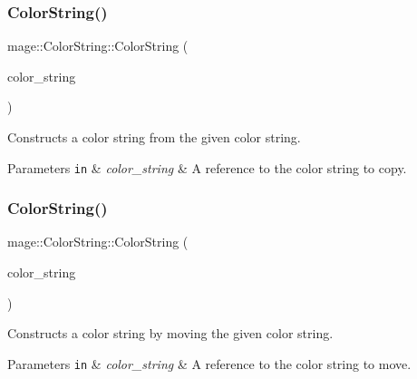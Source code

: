\subsubsection{\texorpdfstring{Color\+String()}{ColorString()}\hspace{0.1cm}{\footnotesize\ttfamily [2/3]}}
{\footnotesize\ttfamily mage\+::\+Color\+String\+::\+Color\+String (\begin{DoxyParamCaption}\item[{const \hyperlink{classmage_1_1_color_string}{Color\+String} \&}]{color\+\_\+string }\end{DoxyParamCaption})\hspace{0.3cm}{\ttfamily [default]}}

Constructs a color string from the given color string.


\begin{DoxyParams}[1]{Parameters}
\mbox{\tt in}  & {\em color\+\_\+string} & A reference to the color string to copy. \\
\hline
\end{DoxyParams}
\hypertarget{classmage_1_1_color_string_a68d8411da4dd7122975223e25bbcbb9a}{}\label{classmage_1_1_color_string_a68d8411da4dd7122975223e25bbcbb9a} 
\subsubsection{\texorpdfstring{Color\+String()}{ColorString()}\hspace{0.1cm}{\footnotesize\ttfamily [3/3]}}
{\footnotesize\ttfamily mage\+::\+Color\+String\+::\+Color\+String (\begin{DoxyParamCaption}\item[{\hyperlink{classmage_1_1_color_string}{Color\+String} \&\&}]{color\+\_\+string }\end{DoxyParamCaption})\hspace{0.3cm}{\ttfamily [default]}}

Constructs a color string by moving the given color string.


\begin{DoxyParams}[1]{Parameters}
\mbox{\tt in}  & {\em color\+\_\+string} & A reference to the color string to move. \\
\hline
\end{DoxyParams}
\hypertarget{classmage_1_1_color_string_a95886010269c8c4bc3a27fbfe829f4c2}{}\label{classmage_1_1_color_string_a95886010269c8c4bc3a27fbfe829f4c2} 
